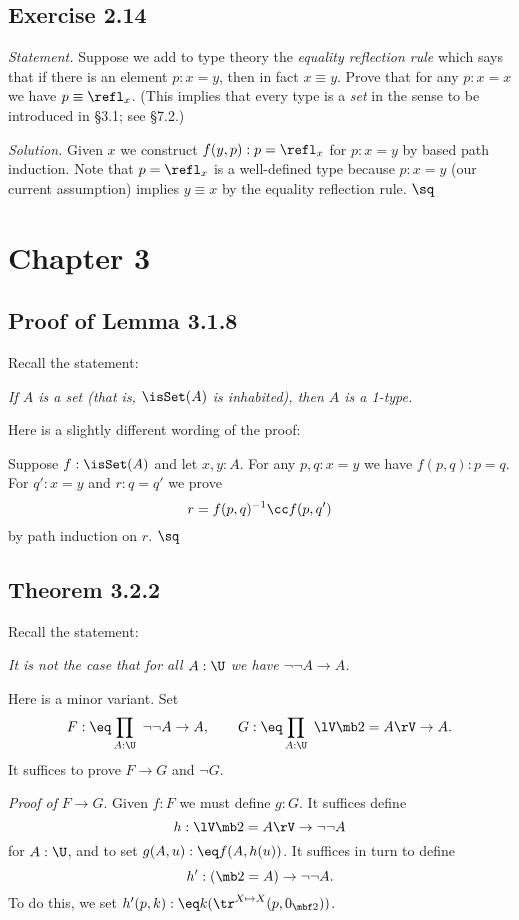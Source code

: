\documentclass[12pt]{article}
\begin{document}

\subsection{Exercise 2.14}

\emph{Statement.} Suppose we add to type theory the \emph{equality reflection rule} which says that if there is an element $p:x=y$, then in fact $x\equiv y$. Prove that for any $p:x=x$ we have $p\equiv\refl_x$. (This implies that every type is a \emph{set} in the sense to be introduced in \S3.1; see \S7.2.)

\nn\emph{Solution.} Given $x$ we construct $f(y,p):p=\refl_x$ for $p:x=y$ by based path induction. Note that $p=\refl_x$ is a well-defined type because $p:x=y$ (our current assumption) implies $y\equiv x$ by the equality reflection rule. $\sq$


\section{Chapter 3}

\subsection{Proof of Lemma 3.1.8}\label{318}

Recall the statement: 

\emph{If $A$ is a set (that is, $\isSet(A)$ is inhabited), then $A$ is a 1-type.} 

Here is a slightly different wording of the proof:

Suppose $f:\isSet(A)$ and let $x,y:A$. For any $p,q:x=y$ we have $f(p,q):p=q$. For $q':x=y$ and $r:q=q'$ we prove 
$$
r=f(p,q)^{-1}\cc f(p,q')
$$ 
by path induction on $r$. $\sq$


\subsection{Theorem 3.2.2} 

Recall the statement:

\nn\emph{It is not the case that for all $A:\U$ we have $\neg\neg A\to A$.}

Here is a minor variant. Set 
$$
F:\eq\prod_{A:\U}\ \neg\neg A\to A,\qquad G:\eq\prod_{A:\U}\ \lV\mb2=A\rV\to A.
$$ 
It suffices to prove $F\to G$ and $\neg G$. 

\nn\emph{Proof of} $F\to G$. Given $f:F$ we must define $g:G$. It suffices define 
$$
h:\lV\mb2=A\rV\to\neg\neg A
$$ 
for $A:\U$, and to set $g(A,u):\eq f(A,h(u))$. It suffices in turn to define 
$$
h':(\mb2=A)\to\neg\neg A.
$$ 
To do this, we set $h'(p,k):\eq k(\tr^{X\mapsto X}(p,0_{\mbf2}))$. 
\end{document}
